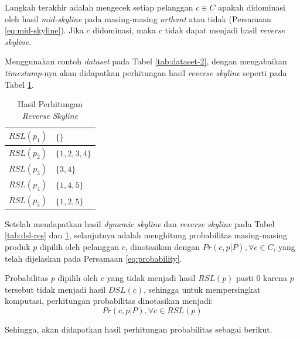 Langkah terakhir adalah mengecek setiap pelanggan $c \in C$ apakah didominasi oleh hasil \textit{mid-skyline} pada masing-masing \textit{orthant} atau tidak (Persamaan \ref{eq:mid-skyline}). Jika $c$ didominasi, maka $c$ tidak dapat menjadi hasil \textit{reverse skyline}.

Menggunakan contoh \textit{dataset} pada Tabel \ref{tab:dataset-2}, dengan mengabaikan \textit{timestamp}-nya akan didapatkan perhitungan hasil \textit{reverse skyline} seperti pada Tabel \ref{tab:rsl-res}.

\begin{table}[H]
	\small
	\centering
	\begin{tabular}{|p{2cm}|p{3cm}|}
		\hline
		$RSL(p_1)$ & $\{\}$ \\ \hline
		$RSL(p_2)$ & $\{1, 2, 3, 4\}$ \\ \hline
		$RSL(p_3)$ & $\{3, 4\}$ \\ \hline
		$RSL(p_4)$ & $\{1, 4, 5\}$\\ \hline
		$RSL(p_5)$ & $\{1, 2, 5\}$ \\ \hline
	\end{tabular} 
	\caption{Hasil Perhitungan \textit{Reverse Skyline}}
	\label{tab:rsl-res}
\end{table}


Setelah mendapatkan hasil \textit{dynamic skyline} dan \textit{reverse skyline} pada Tabel \ref{tab:dsl-res} dan \ref{tab:rsl-res}, selanjutnya adalah menghitung probabilitas masing-masing produk $p$ dipilih oleh pelanggan $c$, dinotasikan dengan $Pr(c, p|P), \forall c \in C$, yang telah dijelaskan pada Persamaan \ref{eq:probability}. 

Probabilitas $p$ dipilih oleh $c$ yang tidak menjadi hasil $RSL(p)$ pasti $0$ karena $p$ tersebut tidak menjadi hasil $DSL(c)$, sehingga untuk mempersingkat komputasi, perhitungan probabilitas dinotasikan menjadi:
\begin{equation}\label{eq:prob-singkat}
Pr(c, p|P), \forall c \in RSL(p)
\end{equation}

Sehingga, akan didapatkan hasil perhitungan probabilitas sebagai berikut.

